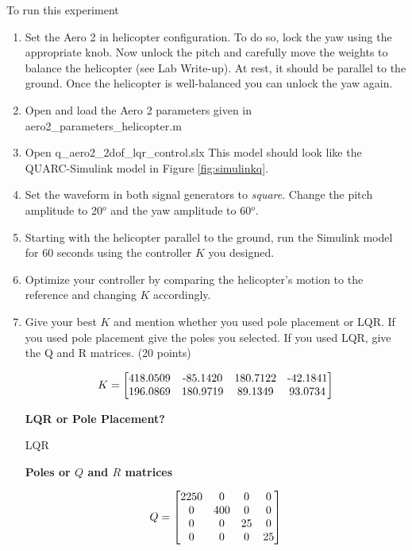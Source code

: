 \documentclass[11pt]{article}
\begin{document}
To run this experiment
\begin{enumerate}

\item Set the Aero 2 in helicopter configuration. To do so, lock the yaw using the appropriate knob. Now unlock the pitch and carefully move the weights to balance the helicopter (see Lab Write-up). At rest, it should be parallel to the ground. Once the helicopter is well-balanced you can unlock the yaw again.

  \item Open and load the Aero 2 parameters given in aero2\_parameters\_helicopter.m
    \item Open q\_aero2\_2dof\_lqr\_control.slx
       This model should look like the QUARC-Simulink model in Figure \ref{fig:simulinkq}.
         \item Set the waveform in both signal generators to \textit{square}. Change the pitch amplitude to 20$^o$ and the yaw amplitude to 60$^o$.

  \item Starting with the helicopter parallel to the ground, run the Simulink model for 60 seconds using the controller $K$ you designed.
    \item Optimize your controller by comparing the helicopter's motion to the reference and changing $K$ accordingly.
    \item Give your best $K$ and mention whether you used pole placement or LQR. If you used pole placement give the poles you selected. If you used LQR, give the Q and R matrices. (20 points)
    
    \[K=\begin{bmatrix}
    $418.0509$ & $-85.1420$ & $180.7122$ & $-42.1841$\\
    $196.0869$ & $180.9719$ & $89.1349$ & $93.0734$\end{bmatrix}\]

\textbf{LQR or Pole Placement?}\\

\vspace{0.5cm}

LQR

\vspace{0.5cm}

\textbf{Poles or \( Q \) and \( R \) matrices\\}

\[Q=\begin{bmatrix}
$2250$ & $0$ & $0$ & $0$\\
$0$ & $400$ & $0$ & $0$\\
$0$ & $0$ & $25$ & $0$\\
$0$ & $0$ & $0$ & $25$
\end{bmatrix}\]


\end{enumerate}
\end{document}
